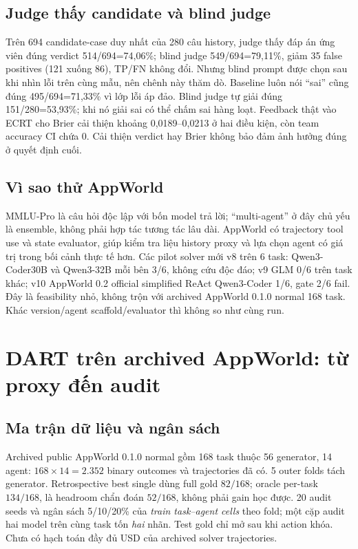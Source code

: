 \documentclass[11pt,a4paper,openany]{book}
\begin{document}
\section{Judge thấy candidate và blind judge}
Trên 694 candidate-case duy nhất của 280 câu history, judge thấy đáp án ứng viên đúng verdict 514/694=74,06\%; blind judge 549/694=79,11\%, giảm 35 false positives (121 xuống 86), TP/FN không đổi. Nhưng blind prompt được chọn sau khi nhìn lỗi trên cùng mẫu, nên chênh này thăm dò. Baseline luôn nói ``sai'' cũng đúng 495/694=71,33\% vì lớp lỗi áp đảo. Blind judge tự giải đúng 151/280=53,93\%; khi nó giải sai có thể chấm sai hàng loạt. Feedback thật vào ECRT cho Brier cải thiện khoảng 0,0189--0,0213 ở hai điều kiện, còn team accuracy CI chứa 0. Cải thiện verdict hay Brier không bảo đảm ảnh hưởng đúng ở quyết định cuối.

\section{Vì sao thử AppWorld}
MMLU-Pro là câu hỏi độc lập với bốn model trả lời; ``multi-agent'' ở đây chủ yếu là ensemble, không phải hợp tác tương tác lâu dài. AppWorld có trajectory tool use và state evaluator, giúp kiểm tra liệu history proxy và lựa chọn agent có giá trị trong bối cảnh thực tế hơn. Các pilot solver mới v8 trên 6 task: Qwen3-Coder30B và Qwen3-32B mỗi bên 3/6, không cứu độc đáo; v9 GLM 0/6 trên task khác; v10 AppWorld 0.2 official simplified ReAct Qwen3-Coder 1/6, gate 2/6 fail. Đây là feasibility nhỏ, không trộn với archived AppWorld 0.1.0 normal 168 task. Khác version/agent scaffold/evaluator thì không so như cùng run.

\chapter{DART trên archived AppWorld: từ proxy đến audit}
\section{Ma trận dữ liệu và ngân sách}
Archived public AppWorld 0.1.0 normal gồm 168 task thuộc 56 generator, 14 agent: \(168\times14=2.352\) binary outcomes và trajectories đã có. 5 outer folds tách generator. Retrospective best single dùng full gold \(82/168\); oracle per-task \(134/168\), là headroom chẩn đoán \(52/168\), không phải gain học được. 20 audit seeds và ngân sách 5/10/20\% của \emph{train task--agent cells} theo fold; một cặp audit hai model trên cùng task tốn \emph{hai} nhãn. Test gold chỉ mở sau khi action khóa. Chưa có hạch toán đầy đủ USD của archived solver trajectories.
\end{document}
